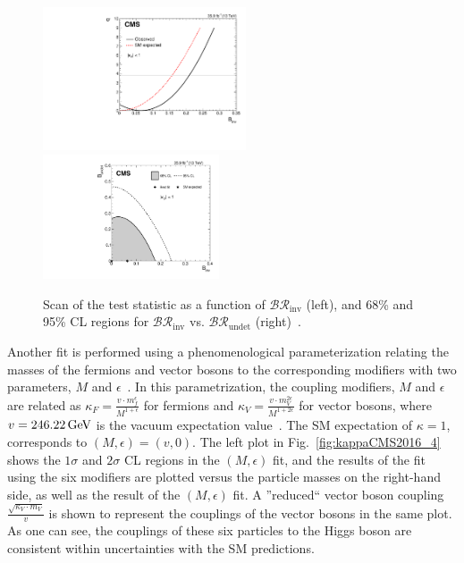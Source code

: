 \begin{figure}[!ht]
\begin{center}
\includegraphics[width=0.535\textwidth]{Fig/HIG17031/scan_pub_observed_K2Undet_BRinv}~
\includegraphics[width=0.465\textwidth]{Fig/HIG17031/plot_BRinvVsBRbsm_N4}\\
\caption{Scan of the test statistic as a function of $\mathcal{BR}_{\text{inv}}$ (left), and 68\% and 95\% CL regions for $\mathcal{BR}_{\text{inv}}$ vs. $\mathcal{BR}_{\text{undet}}$ (right)~\cite{CMS-PAS-HIG-17-031}. \label{fig:kappaCMS2016_3}}
\end{center}
\end{figure}

Another fit is performed using a phenomenological parameterization relating the masses of the fermions and vector bosons to the corresponding modifiers with two parameters, $M$ and $\epsilon$~\cite{Ellis:2012hz,Ellis:2013lra}. In this parametrization, the coupling modifiers, $M$ and $\epsilon$ are related as $\kappa_{F} = \frac{v\cdot m_{f}^{\epsilon}}{M^{1+\epsilon}}$ for fermions and $\kappa_{V} = \frac{v\cdot m_{V}^{2\epsilon}}{M^{1+2\epsilon}}$ for vector bosons, where $v = 246.22\,\text{Ge\hspace{-.08em}V}$ is the vacuum expectation value~\cite{Patrignani:2241948}. The SM expectation of $\kappa=1$, corresponds to $(M, \epsilon) = (v, 0)$. 
The left plot in Fig.~\ref{fig:kappaCMS2016_4} shows the $1\sigma$ and $2\sigma$ CL regions in the $(M,\epsilon)$ fit, and the results of the fit using the six modifiers are plotted versus the particle masses on the right-hand side, as well as the result of the $(M,\epsilon)$ fit. A ''reduced`` vector boson coupling $\frac{\sqrt{\kappa_{V}\cdot m_{V}}}{v}$ is shown to represent the couplings of the vector bosons in the same plot. As one can see, the couplings of these six particles to the Higgs boson are consistent within uncertainties with the SM predictions.

